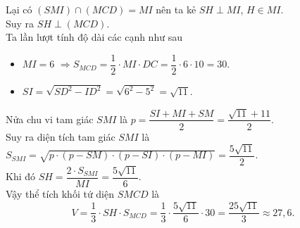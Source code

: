\begin{ex}
{{
		}
		\noindent Lại có $(SMI) \cap (MCD) = MI$ nên ta kẻ $SH \perp MI$, $H \in MI$.\\
		Suy ra $SH \perp (MCD)$.\\
		Ta lần lượt tính độ dài các cạnh như sau
		\begin{itemize}
			\item $MI = 6$ $\Rightarrow S_{MCD}=\dfrac{1}{2}\cdot MI \cdot DC = \dfrac{1}{2}\cdot 6 \cdot 10 = 30$.
			\item $SI=\sqrt{SD^2 - ID^2}=\sqrt{6^2 - 5^2}=\sqrt{11}$.
		\end{itemize}
		Nửa chu vi tam giác $SMI$ là $p=\dfrac{SI+MI+SM}{2}=\dfrac{\sqrt{11}+11}{2}$.\\
		Suy ra diện tích tam giác $SMI$ là $S_{SMI} = \sqrt{p\cdot(p-SM)\cdot(p-SI)\cdot(p-MI)}=\dfrac{5\sqrt{11}}{2}$.\\
		Khi đó $SH = \dfrac{2\cdot S_{SMI}}{MI} = \dfrac{5\sqrt{11}}{6}$.\\
		Vậy thể tích khối tứ diện $SMCD$ là
		\[V=\dfrac{1}{3}\cdot SH \cdot S_{MCD} = \dfrac{1}{3}\cdot \dfrac{5\sqrt{11}}{6}\cdot 30 = \dfrac{25\sqrt{11}}{3} \approx 27{,6}.\]
	}
\end{ex}

